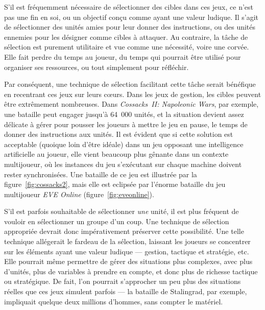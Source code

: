 	S'il est fréquemment nécessaire de sélectionner des cibles dans ces jeux, ce n'est pas une fin en soi, ou un objectif conçu comme ayant une valeur ludique. Il s'agit de sélectionner des unités amies pour leur donner des instructions, ou des unités ennemies pour les désigner comme cibles à attaquer. Au contraire, la tâche de sélection est purement utilitaire et vue comme une nécessité, voire une corvée. Elle fait perdre du temps au joueur, du temps qui pourrait être utilisé pour organiser ses ressources, ou tout simplement pour réfléchir.
	
	Par conséquent, une technique de sélection facilitant cette tâche serait bénéfique en recentrant ces jeux sur leurs cœurs. Dans les jeux de gestion, les cibles peuvent être extrêmement nombreuses. Dans  \emph{Cossacks~II: Napoleonic Wars}, par exemple, une bataille peut engager jusqu'à 64~000 unités, et la situation devient assez délicate à gérer pour pousser les joueurs à mettre le jeu en pause, le temps de donner des instructions aux unités\footnotemark. Il est évident que si cette solution est acceptable (quoique loin d'être idéale) dans un jeu opposant une intelligence artificielle au joueur, elle vient beaucoup plus gênante dans un contexte multijoueur, où les instances du jeu s'exécutant sur chaque machine doivent rester synchronisées. Une bataille de ce jeu est illustrée par la figure~\ref{fig:cossacks2}, mais elle est eclipsée par l'énorme bataille du jeu multijoueur \emph{EVE Online} (figure~\ref{fig:eveonline}).
	
	
	S'il est parfois souhaitable de sélectionner \emph{une} unité, il est plus fréquent de vouloir en sélectionner un groupe d'un coup. Une technique de sélection appropriée devrait donc impérativement préserver cette possibilité. Une telle technique allégerait le fardeau de la sélection, laissant les joueurs se concentrer sur les éléments ayant une valeur ludique --- gestion, tactique et stratégie, etc. Elle pourrait même permettre de gérer des situations plus complexes, avec plus d'unités, plus de variables à prendre en compte, et donc plus de richesse tactique ou stratégique. De fait, l'on pourrait s'approcher un peu plus des situations réelles que ces jeux simulent parfois --- la bataille de Stalingrad, par exemple, impliquait quelque deux millions d'hommes, sans compter le matériel.

